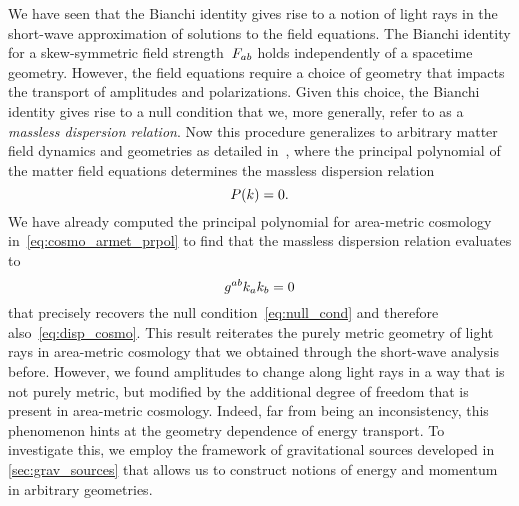 
We have seen that the Bianchi identity gives rise to a notion of light rays in the short-wave approximation of solutions to the field equations. The Bianchi identity for a skew-symmetric field strength~$F_{ab}$ holds independently of a spacetime geometry. However, the field equations require a choice of geometry that impacts the transport of amplitudes and polarizations. Given this choice, the Bianchi identity gives rise to a null condition that we, more generally, refer to as a \emph{massless dispersion relation}. Now this procedure generalizes to arbitrary matter field dynamics and geometries as detailed in~\autocite{DispRel2011}, where the principal polynomial of the matter field equations determines the massless dispersion relation
\begin{equation}
	P(k)=0
	\mathpunct{.}
\end{equation}
We have already computed the principal polynomial for area-metric cosmology in~\eqref{eq:cosmo_armet_prpol} to find that the massless dispersion relation evaluates to
\begin{equation}\label{eq:cosmo_armet_disp}
	g^{ab}k_ak_b=0
\end{equation}
that precisely recovers the null condition~\eqref{eq:null_cond} and therefore also~\eqref{eq:disp_cosmo}. This result reiterates the purely metric geometry of light rays in area-metric cosmology that we obtained through the short-wave analysis before. However, we found amplitudes to change along light rays in a way that is not purely metric, but modified by the additional degree of freedom that is present in area-metric cosmology. Indeed, far from being an inconsistency, this phenomenon hints at the geometry dependence of energy transport. To investigate this, we employ the framework of gravitational sources developed in \autoref{sec:grav_sources} that allows us to construct notions of energy and momentum in arbitrary geometries.

